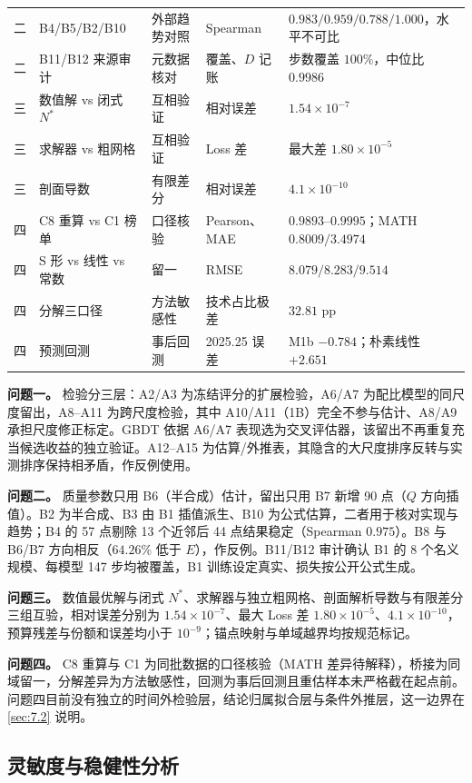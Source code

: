 \begin{table}[H]
\begin{tabularx}{\textwidth}{@{}c p{3.85cm}p{1.55cm}p{2.25cm}X@{}}
二 & B4/B5/B2/B10 & 外部趋势对照 & Spearman & $0.983/0.959/0.788/1.000$，水平不可比 \\
二 & B11/B12 来源审计 & 元数据核对 & 覆盖、$D$ 记账 & 步数覆盖 $100\%$，中位比 $0.9986$ \\
三 & 数值解 vs 闭式 $N^*$ & 互相验证 & 相对误差 & $1.54\times10^{-7}$ \\
三 & 求解器 vs 粗网格 & 互相验证 & Loss 差 & 最大差 $1.80\times10^{-5}$ \\
三 & 剖面导数 & 有限差分 & 相对误差 & $4.1\times10^{-10}$ \\
四 & C8 重算 vs C1 榜单 & 口径核验 & Pearson、MAE & $0.9893$–$0.9995$；MATH $0.8009/3.4974$ \\
四 & S 形 vs 线性 vs 常数 & 留一 & RMSE & $8.079/8.283/9.514$ \\
四 & 分解三口径 & 方法敏感性 & 技术占比极差 & $32.81$ pp \\
四 & 预测回测 & 事后回测 & 2025.25 误差 & M1b $-0.784$；朴素线性 $+2.651$ \\
\bottomrule
\end{tabularx}
\end{table}

\textbf{问题一。} 检验分三层：A2/A3 为冻结评分的扩展检验，A6/A7 为配比模型的同尺度留出，A8–A11 为跨尺度检验，其中 A10/A11（1B）完全不参与估计、A8/A9 承担尺度修正标定。GBDT 依据 A6/A7 表现选为交叉评估器，该留出不再重复充当候选收益的独立验证。A12–A15 为估算/外推表，其隐含的大尺度排序反转与实测排序保持相矛盾，作反例使用。

\textbf{问题二。} 质量参数只用 B6（半合成）估计，留出只用 B7 新增 90 点（$Q$ 方向插值）。B2 为半合成、B3 由 B1 插值派生、B10 为公式估算，二者用于核对实现与趋势；B4 的 57 点剔除 13 个近邻后 44 点结果稳定（Spearman $0.975$）。B8 与 B6/B7 方向相反（$64.26\%$ 低于 $E$），作反例。B11/B12 审计确认 B1 的 8 个名义规模、每模型 147 步均被覆盖，B1 训练设定真实、损失按公开公式生成。

\textbf{问题三。} 数值最优解与闭式 $N^*$、求解器与独立粗网格、剖面解析导数与有限差分三组互验，相对误差分别为 $1.54\times10^{-7}$、最大 Loss 差 $1.80\times10^{-5}$、$4.1\times10^{-10}$，预算残差与份额和误差均小于 $10^{-9}$；锚点映射与单域越界均按规范标记。

\textbf{问题四。} C8 重算与 C1 为同批数据的口径核验（MATH 差异待解释），桥接为同域留一，分解差异为方法敏感性，回测为事后回测且重估样本未严格截在起点前。问题四目前没有独立的时间外检验层，结论归属拟合层与条件外推层，这一边界在 \ref{sec:7.2} 说明。

\subsection{灵敏度与稳健性分析}
\label{sec:6.2}

